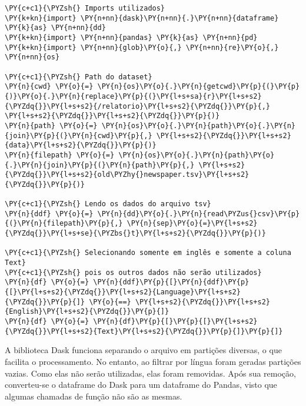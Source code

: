 \documentclass[a4paper,11pt,final]{article}
\begin{document}
\begin{Verbatim}[commandchars=\\\{\},frame=single,fontsize=\small, xleftmargin=0.5em]
\PY{c+c1}{\PYZsh{} Imports utilizados}
\PY{k+kn}{import} \PY{n+nn}{dask}\PY{n+nn}{.}\PY{n+nn}{dataframe} \PY{k}{as} \PY{n+nn}{dd}
\PY{k+kn}{import} \PY{n+nn}{pandas} \PY{k}{as} \PY{n+nn}{pd}
\PY{k+kn}{import} \PY{n+nn}{glob}\PY{o}{,} \PY{n+nn}{re}\PY{o}{,} \PY{n+nn}{os}

\PY{c+c1}{\PYZsh{} Path do dataset}
\PY{n}{cwd} \PY{o}{=} \PY{n}{os}\PY{o}{.}\PY{n}{getcwd}\PY{p}{(}\PY{p}{)}\PY{o}{.}\PY{n}{replace}\PY{p}{(}\PY{l+s+sa}{r}\PY{l+s+s2}{\PYZdq{}}\PY{l+s+s2}{/relatorio}\PY{l+s+s2}{\PYZdq{}}\PY{p}{,} \PY{l+s+s2}{\PYZdq{}}\PY{l+s+s2}{\PYZdq{}}\PY{p}{)}
\PY{n}{path} \PY{o}{=} \PY{n}{os}\PY{o}{.}\PY{n}{path}\PY{o}{.}\PY{n}{join}\PY{p}{(}\PY{n}{cwd}\PY{p}{,} \PY{l+s+s2}{\PYZdq{}}\PY{l+s+s2}{data}\PY{l+s+s2}{\PYZdq{}}\PY{p}{)}
\PY{n}{filepath} \PY{o}{=} \PY{n}{os}\PY{o}{.}\PY{n}{path}\PY{o}{.}\PY{n}{join}\PY{p}{(}\PY{n}{path}\PY{p}{,} \PY{l+s+s2}{\PYZdq{}}\PY{l+s+s2}{old\PYZhy{}newspaper.tsv}\PY{l+s+s2}{\PYZdq{}}\PY{p}{)}

\PY{c+c1}{\PYZsh{} Lendo os dados do arquivo tsv}
\PY{n}{ddf} \PY{o}{=} \PY{n}{dd}\PY{o}{.}\PY{n}{read\PYZus{}csv}\PY{p}{(}\PY{n}{filepath}\PY{p}{,} \PY{n}{sep}\PY{o}{=}\PY{l+s+s2}{\PYZdq{}}\PY{l+s+se}{\PYZbs{}t}\PY{l+s+s2}{\PYZdq{}}\PY{p}{)}

\PY{c+c1}{\PYZsh{} Selecionando somente em inglês e somente a coluna Text}
\PY{c+c1}{\PYZsh{} pois os outros dados não serão utilizados}
\PY{n}{df} \PY{o}{=} \PY{n}{ddf}\PY{p}{[}\PY{n}{ddf}\PY{p}{[}\PY{l+s+s2}{\PYZdq{}}\PY{l+s+s2}{Language}\PY{l+s+s2}{\PYZdq{}}\PY{p}{]} \PY{o}{==} \PY{l+s+s2}{\PYZdq{}}\PY{l+s+s2}{English}\PY{l+s+s2}{\PYZdq{}}\PY{p}{]}
\PY{n}{df} \PY{o}{=} \PY{n}{df}\PY{p}{[}\PY{p}{[}\PY{l+s+s2}{\PYZdq{}}\PY{l+s+s2}{Text}\PY{l+s+s2}{\PYZdq{}}\PY{p}{]}\PY{p}{]}
\end{Verbatim}


A biblioteca Dask funciona separando o arquivo em partições diversas, o que facilita o processamento. No entanto, ao filtrar por língua foram geradas partições vazias.
Como elas não serão utilizadas, elas foram removidas. Após sua remoção, converteu-se o dataframe do Dask para um dataframe do Pandas, visto que algumas chamadas de função não são as mesmas.
\end{document}
